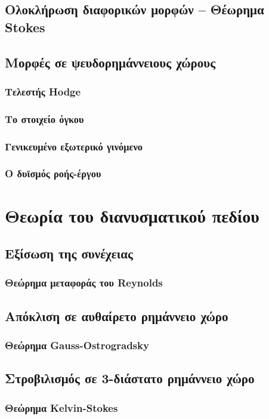 \documentclass[11pt,a4paper,twoside,openright]{book}
\begin{document}
\section{Ολοκλήρωση διαφορικών μορφών -- Θέωρημα Stokes}
\section{Mορφές σε ψευδορημάννειους χώρους}
\subsection{Τελεστής Hodge}
\subsection{Το στοιχείο όγκου}
\subsection{Γενικευμένο εξωτερικό γινόμενο}
\subsection{Ο δυϊσμός ροής-έργου}

\chapter{Θεωρία του διανυσματικού πεδίου}
	\label{chapter:vector-field-theory}
	
\section{Εξίσωση της συνέχειας}
\subsection{Θεώρημα μεταφοράς του Reynolds}
\section{Απόκλιση σε αυθαίρετο ρημάννειο χώρο}
\subsection{Θεώρημα Gauss-Ostrogradsky}
\section{Στροβιλισμός σε 3-διάστατο ρημάννειο χώρο}
\subsection{Θεώρημα Kelvin-Stokes}
\end{document}
